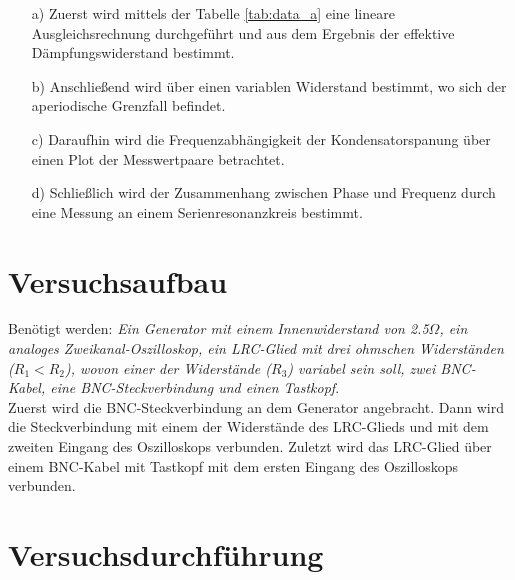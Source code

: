  \begin{enumerate}

    \item[a)] \justifying Zuerst wird mittels der Tabelle \ref{tab:data_a} eine lineare
                          Ausgleichsrechnung durchgeführt und aus dem Ergebnis der effektive
                          Dämpfungswiderstand bestimmt.

    \item[b)] \justifying Anschließend wird über einen variablen Widerstand bestimmt,
                          wo sich der aperiodische Grenzfall befindet. 
  
    \item[c)] \justifying Daraufhin wird die Frequenzabhängigkeit
                          der Kondensatorspanung über einen Plot der Messwertpaare
                          betrachtet.
  
    \item[d)] \justifying Schließlich wird der Zusammenhang zwischen Phase und Frequenz
                          durch eine Messung an einem Serienresonanzkreis bestimmt.
    
  \end{enumerate}


\section{Versuchsaufbau}\justifying
Benötigt werden: \textit{Ein Generator mit einem Innenwiderstand von 2.5$\Omega$, 
ein analoges Zweikanal-Oszilloskop, ein LRC-Glied mit drei ohmschen Widerständen 
($R_1 < R_2$), wovon einer der Widerstände ($R_3$) variabel sein soll, 
zwei BNC-Kabel, eine BNC-Steckverbindung und einen Tastkopf}.\\
Zuerst wird die BNC-Steckverbindung an dem Generator angebracht. 
Dann wird die Steckverbindung mit einem der Widerstände des LRC-Glieds und mit dem zweiten 
Eingang des Oszilloskops verbunden.
Zuletzt wird das LRC-Glied über einem BNC-Kabel mit Tastkopf 
mit dem ersten Eingang des Oszilloskops verbunden.



\section{Versuchsdurchführung}\justifying

